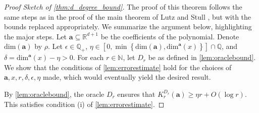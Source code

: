 \documentclass[a4paper,UKenglish,cleveref,autoref,thm-restate]{lipics-v2021}
\renewcommand{\dim}{{\mathrm{dim}}}
\begin{document}
\begin{proof}[Proof Sketch of \cref{thm:d_degree_bound}] 
The proof of this theorem follows the same steps as in the proof of the main theorem of Lutz and Stull \cite{Lutz2020e}, but with the bounds replaced appropriately. We summarize the argument below, highlighting the major steps. Let $\textbf{a}\subseteq\mathbb{R}^{d+1}$ be the coefficients of the polynomial. Denote $\dim(\mathbf{a})$ by $\rho$. Let $\epsilon\in\mathbb{Q}_+$, $\eta\in\left[0,\min\left\{\dim(\textbf{a}),\dim^\textbf{a}(x)\right\}\right]\cap\mathbb{Q}$, and $\delta=\dim^\textbf{a}(x)-\eta>0$. For each $r\in\mathbb{N}$, let $D_r$ be as defined in \cref{lem:oraclebound}. We show that the conditions of \cref{lem:errorestimate} hold for the choices of $\textbf{a},x,r,\delta,\epsilon,\eta$ made, which would eventually yield the desired result. 

By \cref{lem:oraclebound}, the oracle $D_r$ ensures that
$K_r^{D_r}(\textbf{a})\geq\eta r + O(\log r)$. This satisfies
condition (i) of \cref{lem:errorestimate}.


\end{proof}
\end{document}
